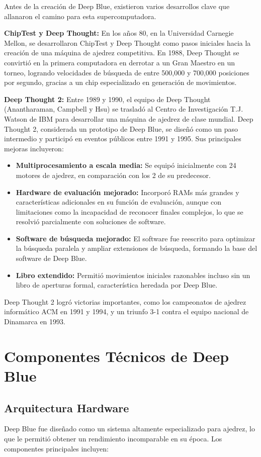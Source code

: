 \documentclass[12pt,a4paper]{article}
\begin{document}
Antes de la creación de Deep Blue, existieron varios desarrollos clave que allanaron el camino para esta supercomputadora.

\textbf{ChipTest y Deep Thought:} En los años 80, en la Universidad Carnegie Mellon, se desarrollaron ChipTest y Deep Thought como pasos iniciales hacia la creación de una máquina de ajedrez competitiva. En 1988, Deep Thought se convirtió en la primera computadora en derrotar a un Gran Maestro en un torneo, logrando velocidades de búsqueda de entre 500,000 y 700,000 posiciones por segundo, gracias a un chip especializado en generación de movimientos.

\textbf{Deep Thought 2:} Entre 1989 y 1990, el equipo de Deep Thought (Anantharaman, Campbell y Hsu) se trasladó al Centro de Investigación T.J. Watson de IBM para desarrollar una máquina de ajedrez de clase mundial. Deep Thought 2, considerada un prototipo de Deep Blue, se diseñó como un paso intermedio y participó en eventos públicos entre 1991 y 1995. Sus principales mejoras incluyeron:  
\begin{itemize}
    \item \textbf{Multiprocesamiento a escala media:} Se equipó inicialmente con 24 motores de ajedrez, en comparación con los 2 de su predecesor.
    \item \textbf{Hardware de evaluación mejorado:} Incorporó RAMs más grandes y características adicionales en su función de evaluación, aunque con limitaciones como la incapacidad de reconocer finales complejos, lo que se resolvió parcialmente con soluciones de software.
    \item \textbf{Software de búsqueda mejorado:} El software fue reescrito para optimizar la búsqueda paralela y ampliar extensiones de búsqueda, formando la base del software de Deep Blue.
    \item \textbf{Libro extendido:} Permitió movimientos iniciales razonables incluso sin un libro de aperturas formal, característica heredada por Deep Blue.
\end{itemize}

Deep Thought 2 logró victorias importantes, como los campeonatos de ajedrez informático ACM en 1991 y 1994, y un triunfo 3-1 contra el equipo nacional de Dinamarca en 1993.

\section{Componentes Técnicos de Deep Blue}

\subsection{Arquitectura Hardware}
Deep Blue fue diseñado como un sistema altamente especializado para ajedrez, lo que le permitió obtener un rendimiento incomparable en su época. Los componentes principales incluyen:
\end{document}
